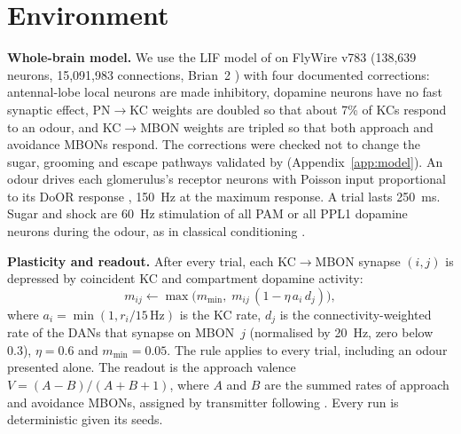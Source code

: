 \documentclass{article}
\begin{document}
\section{Environment}\label{sec:env}
\textbf{Whole-brain model.} We use the LIF model of \citet{shiu2024} on FlyWire v783 (138{,}639 neurons, 15{,}091{,}983 connections, Brian~2 \citep{stimberg2019}) with four documented corrections: antennal-lobe local neurons are made inhibitory, dopamine neurons have no fast synaptic effect, PN$\rightarrow$KC weights are doubled so that about 7\% of KCs respond to an odour, and KC$\rightarrow$MBON weights are tripled so that both approach and avoidance MBONs respond. The corrections were checked not to change the sugar, grooming and escape pathways validated by \citet{shiu2024} (Appendix~\ref{app:model}). An odour drives each glomerulus's receptor neurons with Poisson input proportional to its DoOR response \citep{munch2016}, 150~Hz at the maximum response. A trial lasts 250~ms. Sugar and shock are 60~Hz stimulation of all PAM or all PPL1 dopamine neurons during the odour, as in classical conditioning \citep{tully1985}.

\textbf{Plasticity and readout.} After every trial, each KC$\rightarrow$MBON synapse $(i,j)$ is depressed by coincident KC and compartment dopamine activity:
\begin{equation}
m_{ij} \leftarrow \max\!\big(m_{\min},\; m_{ij}\,(1-\eta\, a_i\, d_j)\big),\label{eq:rule}
\end{equation}
where $a_i=\min(1, r_i/15\,\text{Hz})$ is the KC rate, $d_j$ is the connectivity-weighted rate of the DANs that synapse on MBON~$j$ (normalised by 20~Hz, zero below 0.3), $\eta=0.6$ and $m_{\min}=0.05$. The rule applies to every trial, including an odour presented alone. The readout is the approach valence $V=(A-B)/(A+B+1)$, where $A$ and $B$ are the summed rates of approach and avoidance MBONs, assigned by transmitter following \citet{aso2014}. Every run is deterministic given its seeds.
\end{document}
